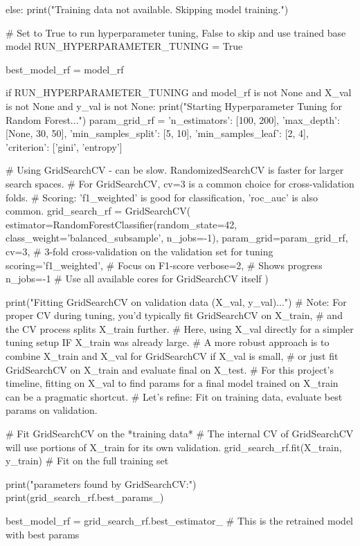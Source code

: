 \begin{ffcode}
else:
    print("Training data not available. Skipping model training.")

# Set to True to run hyperparameter tuning, False to skip and use trained base model
RUN_HYPERPARAMETER_TUNING = True

best_model_rf = model_rf

if RUN_HYPERPARAMETER_TUNING and model_rf is not None and X_val is not None and y_val is not None:
    print("Starting Hyperparameter Tuning for Random Forest...")
    param_grid_rf = {
        'n_estimators': [100, 200],
        'max_depth': [None, 30, 50],
        'min_samples_split': [5, 10],
        'min_samples_leaf': [2, 4],
        'criterion': ['gini', 'entropy']
    }

    # Using GridSearchCV - can be slow. RandomizedSearchCV is faster for larger search spaces.
    # For GridSearchCV, cv=3 is a common choice for cross-validation folds.
    # Scoring: 'f1_weighted' is good for classification, 'roc_auc' is also common.
    grid_search_rf = GridSearchCV(
        estimator=RandomForestClassifier(random_state=42, class_weight='balanced_subsample', n_jobs=-1),
        param_grid=param_grid_rf,
        cv=3, # 3-fold cross-validation on the validation set for tuning
        scoring='f1_weighted', # Focus on F1-score
        verbose=2, # Shows progress
        n_jobs=-1  # Use all available cores for GridSearchCV itself
    )

    print("Fitting GridSearchCV on validation data (X_val, y_val)...")
    # Note: For proper CV during tuning, you'd typically fit GridSearchCV on X_train,
    # and the CV process splits X_train further.
    # Here, using X_val directly for a simpler tuning setup IF X_train was already large.
    # A more robust approach is to combine X_train and X_val for GridSearchCV if X_val is small,
    # or just fit GridSearchCV on X_train and evaluate final on X_test.
    # For this project's timeline, fitting on X_val to find params for a final model trained on X_train can be a pragmatic shortcut.
    # Let's refine: Fit on training data, evaluate best params on validation.

    # Fit GridSearchCV on the *training data*
    # The internal CV of GridSearchCV will use portions of X_train for its own validation.
    grid_search_rf.fit(X_train, y_train) # Fit on the full training set

    print("\nBest parameters found by GridSearchCV:")
    print(grid_search_rf.best_params_)

    best_model_rf = grid_search_rf.best_estimator_ # This is the retrained model with best params


\end{ffcode}
